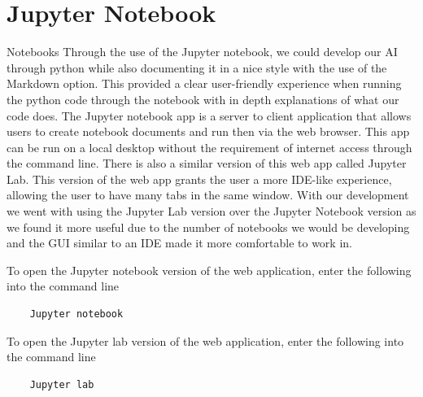 \section{Jupyter Notebook}
Notebooks
Through the use of the Jupyter notebook, we could develop our AI through python while also documenting it in a nice style with the use of the Markdown option. This provided a clear user-friendly experience when running the python code through the notebook with in depth explanations of what our code does. The Jupyter notebook app is a server to client application that allows users to create notebook documents and run then via the web browser. This app can be run on a local desktop without the requirement of internet access through the command line. There is also a similar version of this web app called Jupyter Lab. This version of the web app grants the user a more IDE-like experience, allowing the user to have many tabs in the same window. With our development we went with using the Jupyter Lab version over the Jupyter Notebook version as we found it more useful due to the number of notebooks we would be developing and the GUI similar to an IDE made it more comfortable to work in. 

To open the Jupyter notebook version of the web application, enter the following into the command line
\begin{verbatim}	
	Jupyter notebook 
\end{verbatim}
To open the Jupyter lab version of the web application, enter the following into the command line
\begin{verbatim}
	Jupyter lab 
\end{verbatim}
